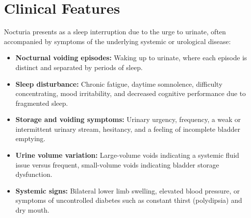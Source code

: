 \section*{Clinical Features}
Nocturia presents as a sleep interruption due to the urge to urinate, often accompanied by symptoms of the underlying systemic or urological disease:
\begin{itemize}
    \item \textbf{Nocturnal voiding episodes:} Waking up to urinate, where each episode is distinct and separated by periods of sleep.
    \item \textbf{Sleep disturbance:} Chronic fatigue, daytime somnolence, difficulty concentrating, mood irritability, and decreased cognitive performance due to fragmented sleep.
    \item \textbf{Storage and voiding symptoms:} Urinary urgency, frequency, a weak or intermittent urinary stream, hesitancy, and a feeling of incomplete bladder emptying.
    \item \textbf{Urine volume variation:} Large-volume voids indicating a systemic fluid issue versus frequent, small-volume voids indicating bladder storage dysfunction.
    \item \textbf{Systemic signs:} Bilateral lower limb swelling, elevated blood pressure, or symptoms of uncontrolled diabetes such as constant thirst (polydipsia) and dry mouth.
\end{itemize}

